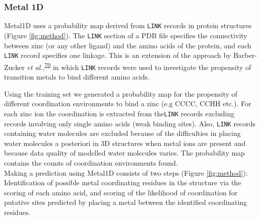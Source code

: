 \documentclass[ lineno,
  9pt]{elife}
\begin{document}
\hypertarget{metal-1d}{%
\subsubsection{Metal 1D}\label{metal-1d}}

Metal1D uses a probability map derived from \texttt{LINK} records in protein structures (Figure \ref{fig:method}). The \texttt{LINK} section of a PDB file specifies the connectivity between zinc (or any other ligand) and the amino acids of the protein, and each \texttt{LINK} record specifies one linkage. This is an extension of the approach by Barber-Zucker \emph{et al.},\textsuperscript{\protect\hyperlink{ref-FB5cckAJ}{70}} in which \texttt{LINK} records were used to investigate the propensity of transition metals to bind different amino acids.

Using the training set we generated a probability map for the propensity of different coordination environments to bind a zinc (e.g CCCC, CCHH etc.). For each zinc ion the coordination is extracted from the\texttt{LINK} records excluding records involving only single amino acids (weak binding sites). Also, \texttt{LINK} records containing water molecules are excluded because of the difficulties in placing water molecules a posteriori in 3D structures when metal ions are present and because data quality of modelled water molecules varies. The probability map contains the counts of coordination environments found. \\
Making a prediction using Metal1D consists of two steps (Figure \ref{fig:method}): Identification of possible metal coordinating residues in the structure via the scoring of each amino acid, and scoring of the likelihood of coordination for putative sites predicted by placing a metal between the identified coordinating residues.
\end{document}
